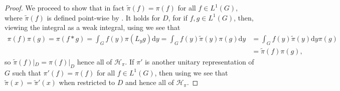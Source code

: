 \documentclass[10pt,twoside,openany,final]{memoir}
\theoremstyle{definition}
\theoremstyle{Break}
\renewcommand{\H}{\mathcal{H}}
\renewcommand{\d}{\mathrm{d}}
\begin{document}
\begin{proof}
We proceed to show that in fact $\tilde{\pi}(f)=\pi(f)$ for all $f \in L^1(G)$, where $\tilde{\pi}(f)$ is defined point-wise by . It holds for $D$, for if $f,g \in L^1(G)$, then, viewing the integral as a weak integral, using  we see that
\begin{align*}
	\pi(f) \pi(g) = \pi(f \ast g ) = \int_G f(y) \pi(L_y g) \d y = \int_G f(y) \tilde{\pi}(y) \pi(g) \d y &= \int_G f(y) \tilde{\pi}(y) \d y \pi(g) \\
	&=\tilde{\pi}(f) \pi(g),
\end{align*}
so $\tilde{\pi}(f)|_D = \pi(f)|_D$ hence all of $\H_\pi$. If $\pi'$ is another unitary representation of $G$ such that $\pi'(f)=\pi(f)$ for all $f \in L^1(G)$, then using  we see that $\tilde{\pi}(x)=\tilde{\pi}'(x)$ when restricted to $D$ and hence all of $\H_\pi$.
\end{proof}
\end{document}
